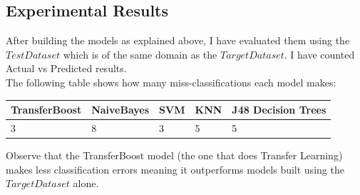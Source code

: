 \documentclass[a4paper,12pt, english]{article}
\begin{document}
\subsection{Experimental Results}
After building the models as explained above, I have evaluated them using the $Test Dataset$ which is of the same domain as the $Target Dataset$. I have counted Actual vs Predicted results.\\
The following table shows how many miss-classifications each model makes:\\ 
\begin{center}
    \begin{tabular}{ | l | l | l | p{5cm} | l |}
    \hline
    TransferBoost & NaiveBayes & SVM & KNN & J48 Decision Trees \\ \hline
    3 & 8 & 3 & 5 & 5\\
    \hline
    \end{tabular}       
\end{center}

Observe that the TransferBoost model (the one that does Transfer Learning) makes less classification errors meaning it outperforms models built using the $Target Dataset$ alone.
\end{document}
